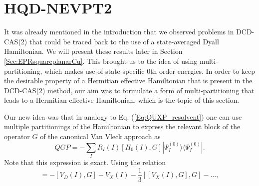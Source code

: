 \section{HQD-NEVPT2}
\label{Sec:HQD}
It was already mentioned in the introduction that we observed problems in DCD-CAS(2) that could be traced back to the use of a state-averaged Dyall Hamiltonian. We will present these results later in Section \ref{Sec:EPRsquareplanarCu}. This brought us to the idea of using multi-partitioning, which makes use of state-specific 0th order energies. In order to keep the desirable property of a Hermitian effective Hamiltonian that is present in the DCD-CAS(2) method, our aim was to formulate a form of multi-partitioning that leads to a Hermitian effective Hamiltonian, which is the topic of this section.

Our new idea was that in analogy to Eq. (\ref{Eq:QUXP_resolvent}) one can use multiple partitionings of the Hamiltonian to express the relevant block of the operator $G$ of the canonical Van Vleck approach as
	\begin{equation}
	\label{Eq:QGP_resolvent_new}
	QGP =  - \sum\limits_I {{R_I}} (I)[{H_0}(I),G]|\Psi _I^{(0)}\rangle \langle \Psi _I^{(0)}|.
	\end{equation}
Note that this expression is exact. Using the relation\cite{ShaviR_1980_5711}
	\begin{equation}[{H_0}(I),G] =  - [{V_D}(I),G] - {V_X}(I) - \frac{1}{3}[[{V_X}(I),G],G] -  \ldots ,\end{equation}

